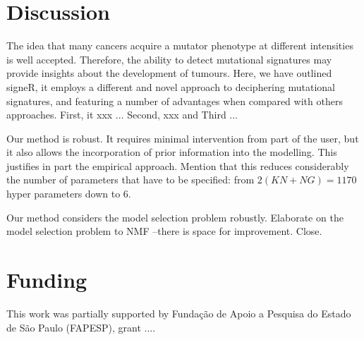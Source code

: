 \documentclass{bioinfo}
\begin{document}
\section{Discussion}
The idea that many cancers acquire a mutator phenotype at different 
intensities is well accepted. Therefore, the ability to detect 
mutational signatures may provide insights about the development of
tumours. Here, we have outlined signeR, it employs a different and 
novel approach to deciphering mutational signatures, and featuring a
number of advantages when compared with others approaches. First, it
xxx $\ldots$ Second, xxx and Third $\ldots$ 


Our method is robust. It requires minimal intervention from part of
the user, but it also allows the incorporation of prior information
into the modelling. This justifies in part the empirical
approach. Mention that this reduces considerably the number of
parameters that have to be specified: from $2(KN+NG)=1170$ hyper
parameters down to 6.


Our method considers the model selection problem robustly. Elaborate
on the model selection problem to NMF --there is space for
improvement. Close.


\section*{Funding}
This work was partially supported by Funda\c{c}\~ao de Apoio a
Pesquisa do Estado de S\~ao Paulo (FAPESP), grant $\ldots$. 
\vspace*{-12pt}
 
 

\end{document}
